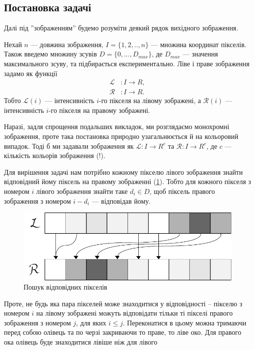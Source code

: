 \subsection{Постановка задачі}
Далі під ''зображенням'' будемо розуміти деякий рядок вихідного зображення.

Нехай $n$ --- довжина зображення, $I = \{1, 2, .., n\}$ --- множина координат пікселів. Також введемо множину зсувів $D = \{0, ... , D_{max}\}$, де $D_{max}$ --- значення максимального зсуву, та підбирається експериментально. 
Ліве і праве зображення задамо як функції
\begin{align*}
	\mathcal{L} &: I \rightarrow R , \\
	\mathcal{R} &: I \rightarrow R .
\end{align*}
Тобто $\mathcal{L}(i)$ --- інтенсивність $i$-го пікселя на лівому зображені, а $\mathcal{R}(i)$ --- інтенсивність $i$-го пікселя на правому зображені.

Наразі, задля спрощення подальших викладок, ми розглядаємо монохромні зображення, проте така постановка природно узагальнюється й на кольоровий випадок. Тоді б ми задавали зображення як $ \mathcal{L} : I \rightarrow R^c $ та $ \mathcal{R} : I \rightarrow R^c $, де $ c $ --- кількість кольорів зображення (!).

Для вирішення задачі нам потрібно кожному пікселю лівого зображення знайти відповідний йому піксель на правому зображенні (\ref{mapping}). Тобто для кожного пікселя з номером $i$ лівого зображення знайти таке $ d_i \in D$, щоб піксель правого зображення  з номером $i - d_i$ --- відповідав йому.
\begin{figure}[h!]
	\centering
	\includegraphics[scale = 1]{mapping.pdf}
	\caption{Пошук відповідних пікселів}
	\label{mapping}
\end{figure}
Проте, не будь яка пара пікселей може знаходитися у відповідності -- пікселю з номером $i$ на лівому зображені можуть відповідати тільки ті пікселі  правого зображення з номером $j$, для яких $i \leq j$. Переконатися в цьому можна тримаючи перед собою олівець та по черзі закриваючи то праве, то ліве око. Для правого ока олівець буде знаходитися лівіше ніж для лівого

